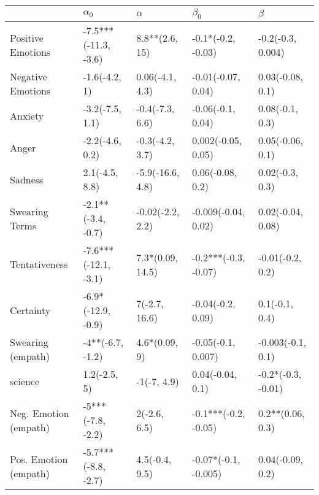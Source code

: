 \begin{tabular}{lllll}
\toprule
{} &            $\alpha_0$ &          $\alpha$ &             $\beta_0$ &             $\beta$ \\
\midrule
Positive Emotions     &  -7.5***(-11.3, -3.6) &    8.8**(2.6, 15) &    -0.1*(-0.2, -0.03) &   -0.2(-0.3, 0.004) \\
Negative Emotions     &         -1.6(-4.2, 1) &   0.06(-4.1, 4.3) &    -0.01(-0.07, 0.04) &    0.03(-0.08, 0.1) \\
Anxiety               &       -3.2(-7.5, 1.1) &   -0.4(-7.3, 6.6) &     -0.06(-0.1, 0.04) &     0.08(-0.1, 0.3) \\
Anger                 &       -2.2(-4.6, 0.2) &   -0.3(-4.2, 3.7) &    0.002(-0.05, 0.05) &    0.05(-0.06, 0.1) \\
Sadness               &        2.1(-4.5, 8.8) &  -5.9(-16.6, 4.8) &      0.06(-0.08, 0.2) &     0.02(-0.3, 0.3) \\
Swearing Terms        &    -2.1**(-3.4, -0.7) &  -0.02(-2.2, 2.2) &   -0.009(-0.04, 0.02) &   0.02(-0.04, 0.08) \\
Tentativeness         &  -7.6***(-12.1, -3.1) &  7.3*(0.09, 14.5) &  -0.2***(-0.3, -0.07) &    -0.01(-0.2, 0.2) \\
Certainty             &    -6.9*(-12.9, -0.9) &     7(-2.7, 16.6) &     -0.04(-0.2, 0.09) &      0.1(-0.1, 0.4) \\
Swearing (empath)     &      -4**(-6.7, -1.2) &     4.6*(0.09, 9) &    -0.05(-0.1, 0.007) &   -0.003(-0.1, 0.1) \\
science               &          1.2(-2.5, 5) &       -1(-7, 4.9) &      0.04(-0.04, 0.1) &  -0.2*(-0.3, -0.01) \\
Neg. Emotion (empath) &     -5***(-7.8, -2.2) &      2(-2.6, 6.5) &  -0.1***(-0.2, -0.05) &    0.2**(0.06, 0.3) \\
Pos. Emotion (empath) &   -5.7***(-8.8, -2.7) &    4.5(-0.4, 9.5) &  -0.07*(-0.1, -0.005) &    0.04(-0.09, 0.2) \\
\bottomrule
\end{tabular}
